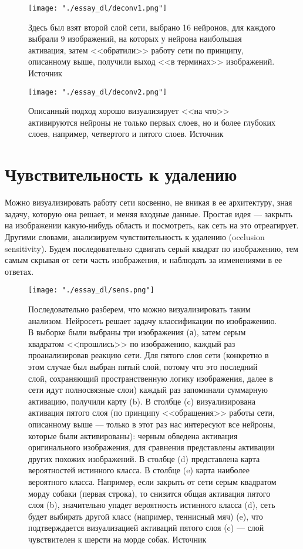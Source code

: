 \documentclass[12pt,fleqn]{article}
\begin{document}
\begin{figure}[H]
\centering
\texttt{[image: "./essay\_dl/deconv1.png"]}
\caption{Здесь был взят второй слой сети, выбрано 16 нейронов, для каждого выбрали 9 изображений, на которых у нейрона наибольшая активация, затем <<обратили>> работу сети по принципу, описанному выше, получили выход <<в терминах>> изображений. Источник \cite{deconv}}
\end{figure}

\begin{figure}[H]
\centering
\texttt{[image: "./essay\_dl/deconv2.png"]}
\caption{Описанный подход хорошо визуализирует <<на что>> активируются нейроны не только первых слоев, но и более глубоких слоев, например, четвертого и пятого слоев. Источник \cite{deconv}}
\end{figure}

\section{Чувствительность к удалению}

Можно визуализировать работу сети косвенно, не вникая в ее архитектуру, зная задачу, которую она решает, и меняя входные данные. Простая идея --- закрыть на изображении какую-нибудь область и посмотреть, как сеть на это отреагирует. Другими словами, анализируем чувствительность к удалению (occlusion sensitivity). Будем последовательно сдвигать серый квадрат по изображению, тем самым скрывая от сети часть изображения, и наблюдать за изменениями в ее ответах.

\begin{figure}[H]
\centering
\texttt{[image: "./essay\_dl/sens.png"]}
\caption{Последовательно разберем, что можно визуализировать таким анализом. Нейросеть решает задачу классификации по изображению. В выборке были выбраны три изображения (а), затем серым квадратом <<прошлись>> по изображению, каждый раз проанализировав реакцию сети. Для пятого слоя сети (конкретно в этом случае был выбран пятый слой, потому что это последний слой, сохраняющий пространственную логику изображения, далее в сети идут полносвязные слои) каждый раз запоминали суммарную активацию, получили карту (b). В столбце (c) визуализирована активация пятого слоя (по принципу <<обращения>> работы сети, описанному выше --- только в этот раз нас интересуют все нейроны, которые были активированы): черным обведена активация оригинального изображения, для сравнения представлены активации других похожих изображений. В столбце (d) представлена карта вероятностей истинного класса. В столбце (e) карта наиболее вероятного класса. Например, если закрыть от сети серым квадратом морду собаки (первая строка), то снизится общая активация пятого слоя (b), значительно упадет вероятность истинного класса (d), сеть будет выбирать другой класс (например, теннисный мяч) (e), что подтверждается визуализацией активаций пятого слоя (c) --- слой чувствителен к шерсти на морде собак. Источник \cite{deconv}}
\end{figure}
\end{document}
